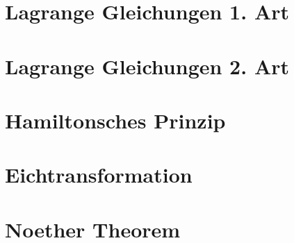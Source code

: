 \section{Lagrange Gleichungen 1. Art}

\section{Lagrange Gleichungen 2. Art}

\section{Hamiltonsches Prinzip}

\section{Eichtransformation}

\section{Noether Theorem}